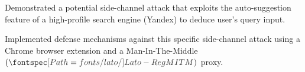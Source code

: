 \documentclass[]{deedy_format_Hien}
\begin{document}
\begin{minipage}[t]{0.66\textwidth}
\vspace{1mm}
\justify
\begin{tightemize}
\item Demonstrated a potential side-channel attack that exploits the auto-suggestion feature of a high-profile search engine (Yandex) to deduce user's query input. 
\item Implemented defense mechanisms against this specific side-channel attack using a Chrome browser extension and a Man-In-The-Middle $(\custombold{MITM})$ proxy. 
\end{tightemize}
\vspace{\topsep}
\sectionsep

%
%
\end{minipage} 
\end{document}
